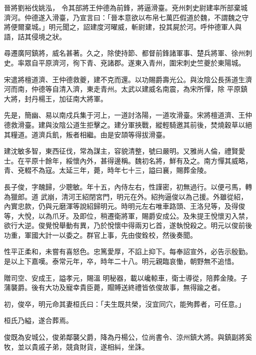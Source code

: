 \begin{pinyinscope}
 晉將劉裕伐姚泓，
 令其部將王仲德為前鋒，將逼滑臺。兗州刺史尉建率所部棄城濟河。仲德遂入滑臺，乃宣言曰：「晉本意欲以布帛七萬匹假道於魏，不謂魏之守將便爾棄城。」明元聞之，詔建度河曜威，斬尉建，投其屍於河。呼仲德軍人與語，詰其侵境之狀。



 尋遷廣阿鎮將，威名甚著。久之，除使持節、都督前鋒諸軍事、楚兵將軍、徐州刺史。率眾自平原濟河，徇下青、兗諸郡。遂東入青州，圍宋刺史竺夔於東陽城。



 宋遣將檀道濟、王仲德救夔，建不克而還。以功賜爵壽光公。與汝陰公長孫道生濟河而南，仲德等自清入濟，東走青州。太武以建威名南震，為宋所憚，除
 平原鎮大將，封丹楊王，加征南大將軍。



 先是，簡幽、易以南戍兵集于河上，一道討洛陽，一道攻滑臺。宋將檀道濟、王仲德救滑臺。建與汝陰公道生拒擊之。建分軍挾戰，縱輕騎邀其前後，焚燒穀草以絕其糧道。道濟兵飢，叛者相繼。由是安頡等得拔滑臺。



 建沈敏多智，東西征伐，常為謀主，容貌清整，號曰嚴明。又雅尚人倫，禮賢愛士。在平原十餘年，綏懷內外，甚得邊稱。魏初名將，鮮有及之。南方憚其威略，青、兗輟不為寇。太延三年，薨，時年七十三，謚曰襄，賜葬金陵。



 長子俊，字醜歸，少聰敏。年十五，內侍左右，性謹密，初無過行。以便弓馬，轉為獵郎。道
 武崩，清河王紹閉宮門，明元在外。紹拘逼俊以為己援。外雖從紹，內實忠款，仍與元磨渾等說紹歸明元。時明元左右唯車路頭、王洛兒等，及得俊等，大悅，以為爪牙。及即位，稍遷衛將軍，賜爵安成公。及朱提王悅懷刃入禁，欲行大逆。俊覺悅舉動有異，乃於悅懷中得兩刃匕首，遂執悅殺之。明元以俊前後功重，軍國大計一以委之。群官上事，先由俊銓校，然後奏聞。



 性平正柔和，未嘗有喜怒色。忠篤愛厚，不諂上抑下。每奉詔宣外，必告示殷勤。是以上下嘉嘆。泰常元年，卒，時年二十八。明元親臨哀慟，朝野無不追惜。



 贈司空、安成王，謚孝元，賜溫
 明秘器，載以巉輬車，衛士導從，陪葬金陵。子蒲襲爵。後有大功及寵幸貴臣薨，賵賻送終禮皆依俊故事，無得踰之者。



 初，俊卒，明元命其妻桓氏曰：「夫生既共榮，沒宜同穴，能殉葬者，可任意。」



 桓氏乃縊，遂合葬焉。



 俊既為安城公，俊弟鄰襲父爵，降為丹楊公，位尚書令、涼州鎮大將。與鎮副將奚牧，並以貴戚子弟，競貪財貨，遂相糾，坐誅。




\end{pinyinscope}
